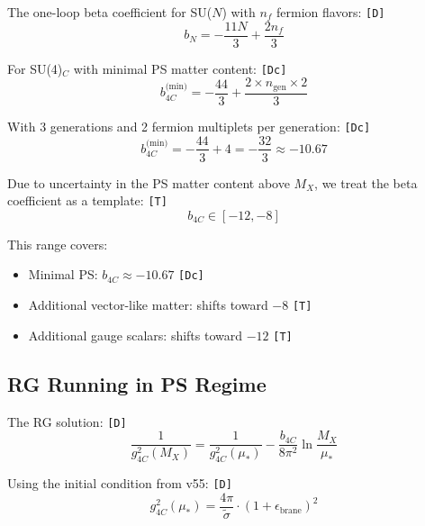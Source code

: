 \documentclass[11pt,a4paper]{article}
\newcommand{\tagD}{\textcolor{green!50!black}{\texttt{[D]}}}
\newcommand{\tagDc}{\textcolor{blue!70!black}{\texttt{[Dc]}}}
\newcommand{\tagT}{\textcolor{cyan!70!black}{\texttt{[T]}}}
\theoremstyle{definition}
\begin{document}
The one-loop beta coefficient for SU($N$) with $n_f$ fermion flavors: \tagD{}
\begin{equation}
\label{eq:beta-general}
b_N = -\frac{11N}{3} + \frac{2n_f}{3}
\end{equation}

For SU(4)$_C$ with minimal PS matter content: \tagDc{}
\begin{equation}
\label{eq:b4c-minimal}
b_{4C}^{\text{(min)}} = -\frac{44}{3} + \frac{2 \times n_{\text{gen}} \times 2}{3}
\end{equation}

With 3 generations and 2 fermion multiplets per generation: \tagDc{}
\begin{equation}
\label{eq:b4c-minimal-value}
b_{4C}^{\text{(min)}} = -\frac{44}{3} + 4 = -\frac{32}{3} \approx -10.67
\end{equation}

\begin{templatebox}
Due to uncertainty in the PS matter content above $M_X$, we treat the
beta coefficient as a template: \tagT{}
\begin{equation}
\label{eq:b4c-template}
\boxed{b_{4C} \in [-12, -8]}
\end{equation}

This range covers:
\begin{itemize}
  \item Minimal PS: $b_{4C} \approx -10.67$ \tagDc{}
  \item Additional vector-like matter: shifts toward $-8$ \tagT{}
  \item Additional gauge scalars: shifts toward $-12$ \tagT{}
\end{itemize}
\end{templatebox}

\subsection{RG Running in PS Regime}
\label{subsec:ps-rg-running}

The RG solution: \tagD{}
\begin{equation}
\label{eq:ps-rg-solution}
\frac{1}{g_{4C}^2(M_X)} = \frac{1}{g_{4C}^2(\mu_*)} - \frac{b_{4C}}{8\pi^2} \ln\frac{M_X}{\mu_*}
\end{equation}

Using the initial condition from v55: \tagD{}
\begin{equation}
\label{eq:ps-initial}
g_{4C}^2(\mu_*) = \frac{4\pi}{\tilde{\sigma}} \cdot (1 + \epsilon_{\text{brane}})^2
\end{equation}
\end{document}
